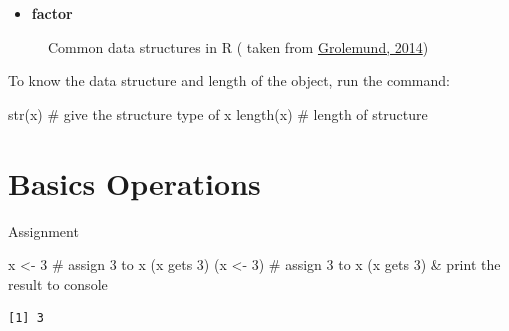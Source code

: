 \documentclass[
  letterpaper,
  DIV=11,
  numbers=noendperiod]{scrreprt}
\newenvironment{Shaded}{\begin{snugshade}}{\end{snugshade}}
\newcommand{\CommentTok}[1]{\textcolor[rgb]{0.37,0.37,0.37}{#1}}
\newcommand{\DecValTok}[1]{\textcolor[rgb]{0.68,0.00,0.00}{#1}}
\newcommand{\FunctionTok}[1]{\textcolor[rgb]{0.28,0.35,0.67}{#1}}
\newcommand{\NormalTok}[1]{\textcolor[rgb]{0.00,0.23,0.31}{#1}}
\newcommand{\OtherTok}[1]{\textcolor[rgb]{0.00,0.23,0.31}{#1}}
\providecommand{\tightlist}{%
  \setlength{\itemsep}{0pt}\setlength{\parskip}{0pt}}\usepackage{longtable,booktabs,array}
\begin{document}
\begin{itemize}
\tightlist
\item
  \textbf{factor}
\end{itemize}

\begin{figure}


\caption{\label{fig-datastructure}Common data structures in R ( taken
from \href{https://jjallaire.github.io/hopr/objects.html}{Grolemund,
2014})}

\end{figure}%

To know the data structure and length of the object, run the command:

\begin{Shaded}
\begin{Highlighting}[]
\FunctionTok{str}\NormalTok{(x) }\CommentTok{\# give the structure type of x}
\FunctionTok{length}\NormalTok{(x) }\CommentTok{\# length of structure}
\end{Highlighting}
\end{Shaded}

\section{Basics Operations}\label{basics-operations}

Assignment

\begin{Shaded}
\begin{Highlighting}[]
\NormalTok{x }\OtherTok{\textless{}{-}} \DecValTok{3} \CommentTok{\# assign 3 to x (x gets 3)}
\NormalTok{(x }\OtherTok{\textless{}{-}} \DecValTok{3}\NormalTok{) }\CommentTok{\# assign 3 to x (x gets 3) \& print the result to console}
\end{Highlighting}
\end{Shaded}

\begin{verbatim}
[1] 3
\end{verbatim}
\end{document}
